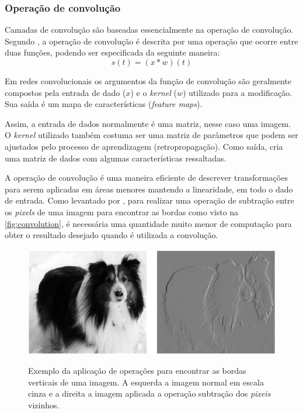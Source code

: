 \subsubsection{Operação de convolução}
Camadas de convolução são baseadas essencialmente na operação de convolução. Segundo \cite{Goodfellow-et-al-2016}, a operação de convolução é descrita por uma operação que ocorre entre duas funções, podendo ser especificada da seguinte maneira:\[s(t) = (x*w)(t)\] %


Em redes convolucionais os argumentos da função de convolução são geralmente compostos pela entrada de dado ($x$) e o \textit{kernel} ($w$) utilizado para a modificação. Sua saída é um mapa de características (\textit{feature maps}).

\par Assim, a entrada de dados normalmente é uma matriz, nesse caso uma imagem. O \textit{kernel} utilizado também costuma ser uma matriz de parâmetros que podem ser ajustados pelo processo de aprendizagem (retropropagação). Como saída, cria uma matriz de dados com algumas características ressaltadas.

\par A operação de convolução é uma maneira eficiente de descrever transformações para serem aplicadas em áreas menores mantendo a linearidade, em todo o dado de entrada. Como levantado por , para realizar uma operação de subtração entre os \textit{pixels} de uma imagem para encontrar as bordas como visto na \autoref{fig:convolution}, é necessária uma quantidade muito menor de computação para obter o resultado desejado quando é utilizada a convolução.

\begin{figure}[H]
  \centering
  \caption{Exemplo da aplicação de operações para encontrar as bordas verticais de uma imagem. A esquerda a imagem normal em escala cinza e a direita a imagem aplicada a operação subtração dos \textit{pixeis} vizinhos.}
  \includegraphics[width=400pt]{dados/figuras/convolution}
  \label{fig:convolution}
\end{figure}


